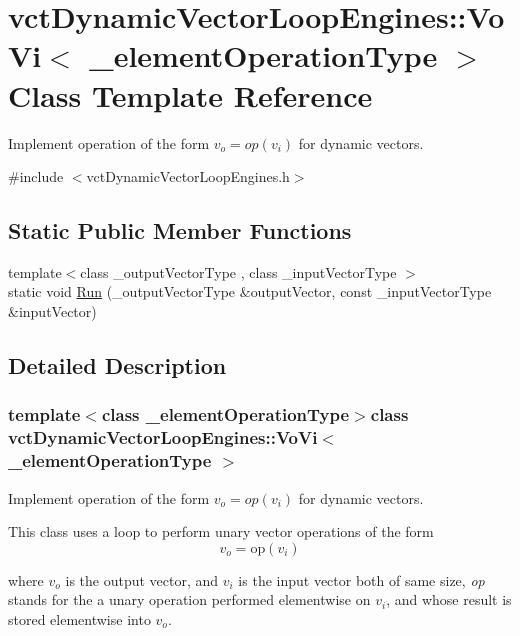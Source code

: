 \hypertarget{classvct_dynamic_vector_loop_engines_1_1_vo_vi}{}\section{vct\+Dynamic\+Vector\+Loop\+Engines\+:\+:Vo\+Vi$<$ \+\_\+element\+Operation\+Type $>$ Class Template Reference}
\label{classvct_dynamic_vector_loop_engines_1_1_vo_vi}


Implement operation of the form $v_o = op(v_i)$ for dynamic vectors.  




{\ttfamily \#include $<$vct\+Dynamic\+Vector\+Loop\+Engines.\+h$>$}

\subsection*{Static Public Member Functions}
\begin{DoxyCompactItemize}
\item 
{\footnotesize template$<$class \+\_\+output\+Vector\+Type , class \+\_\+input\+Vector\+Type $>$ }\\static void \hyperlink{classvct_dynamic_vector_loop_engines_1_1_vo_vi_a5beea25301a89db0c5c75e21224afca2}{Run} (\+\_\+output\+Vector\+Type \&output\+Vector, const \+\_\+input\+Vector\+Type \&input\+Vector)
\end{DoxyCompactItemize}


\subsection{Detailed Description}
\subsubsection*{template$<$class \+\_\+element\+Operation\+Type$>$class vct\+Dynamic\+Vector\+Loop\+Engines\+::\+Vo\+Vi$<$ \+\_\+element\+Operation\+Type $>$}

Implement operation of the form $v_o = op(v_i)$ for dynamic vectors. 

This class uses a loop to perform unary vector operations of the form \[ v_{o} = \mathrm{op}(v_{i}) \]

where $v_{o}$ is the output vector, and $v_{i}$ is the input vector both of same size, {\itshape op} stands for the a unary operation performed elementwise on $v_{i}$, and whose result is stored elementwise into $v_{o}$.


